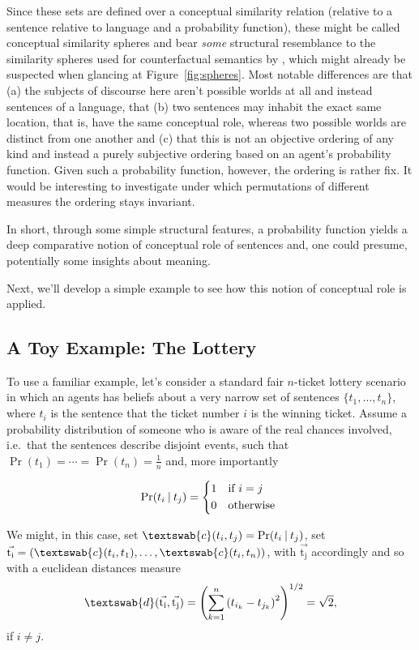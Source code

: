 \documentclass[11pt, a4paper]{scrartcl}
\renewcommand{\i}[1]{\emph{#1}}
\renewcommand{\v}[1]{\vec{\mathrm{#1}}}
\newcommand{\m}[1]{\textswab{#1}}
\newcommand{\given}[1][]{\:#1\vert\:}
\begin{document}
Since these sets are defined over a conceptual similarity relation (relative to a sentence relative to language and a probability function), these might be called conceptual similarity spheres and bear \i{some} structural resemblance to the similarity spheres used for counterfactual semantics by \textcite{Lewis1973-LEWC-2}, which might already be suspected when glancing at Figure~\ref{fig:spheres}. Most notable differences are that (a) the subjects of discourse here aren't possible worlds at all and instead sentences of a language, that (b) two sentences may inhabit the exact same location, that is, have the same conceptual role, whereas two possible worlds are distinct from one another and (c) that this is not an objective ordering of any kind and instead a purely subjective ordering based on an agent's probability function. Given such a probability function, however, the ordering is rather fix. It would be interesting to investigate under which permutations of different measures the ordering stays invariant.

In short, through some simple structural features, a probability function yields a deep comparative notion of conceptual role of sentences and, one could presume, potentially some insights about meaning.

Next, we'll develop a simple example to see how this notion of conceptual role is applied.

\subsection{A Toy Example: The Lottery}

To use a familiar example, let's consider a standard fair $n$-ticket lottery scenario in which an agents has beliefs about a very narrow set of sentences $\{ t_1, \dots, t_n\}$, where $t_i$ is the sentence that the ticket number $i$ is the winning ticket. Assume a probability distribution of someone who is aware of the real chances involved, i.e.\ that the sentences describe disjoint events, such that $\Pr(t_1) = \cdots = \Pr(t_n) = \frac{1}{n}$ and, more importantly

\[
    \Pr(t_i \given t_j)  =
    \begin{cases*}
        1 & if $i = j$ \\
        0        & otherwise
    \end{cases*}
\]

We might, in this case, set $\m{c}(t_i, t_j) = \Pr(t_i \given t_j)$, set $\v{t_i} = (\m{c}(t_i,t_1),\ldots,\m{c}(t_i,t_n))$, with $\v{t_j}$ accordingly and so with a euclidean distances measure 
\[
    \m{d}(\v{t_i},\v{t_j}) = {\left( \sum_{k=1}^n {(t_{i_k}-t_{j_k})}^2 \right)}^{1/2} = \sqrt{2},  
\]
if $i \not = j$.
\end{document}
